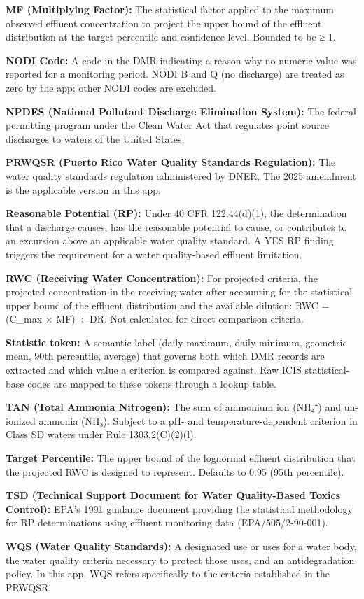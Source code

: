 \documentclass[
  11pt,
  letterpaper,
  DIV=11,
  numbers=noendperiod]{scrartcl}
\begin{document}
\textbf{MF (Multiplying Factor):} The statistical factor applied to the
maximum observed effluent concentration to project the upper bound of
the effluent distribution at the target percentile and confidence level.
Bounded to be ≥ 1.

\textbf{NODI Code:} A code in the DMR indicating a reason why no numeric
value was reported for a monitoring period. NODI B and Q (no discharge)
are treated as zero by the app; other NODI codes are excluded.

\textbf{NPDES (National Pollutant Discharge Elimination System):} The
federal permitting program under the Clean Water Act that regulates
point source discharges to waters of the United States.

\textbf{PRWQSR (Puerto Rico Water Quality Standards Regulation):} The
water quality standards regulation administered by DNER. The 2025
amendment is the applicable version in this app.

\textbf{Reasonable Potential (RP):} Under 40 CFR 122.44(d)(1), the
determination that a discharge causes, has the reasonable potential to
cause, or contributes to an excursion above an applicable water quality
standard. A YES RP finding triggers the requirement for a water
quality-based effluent limitation.

\textbf{RWC (Receiving Water Concentration):} For projected criteria,
the projected concentration in the receiving water after accounting for
the statistical upper bound of the effluent distribution and the
available dilution: RWC = (C\_max × MF) ÷ DR. Not calculated for
direct-comparison criteria.

\textbf{Statistic token:} A semantic label (daily maximum, daily
minimum, geometric mean, 90th percentile, average) that governs both
which DMR records are extracted and which value a criterion is compared
against. Raw ICIS statistical-base codes are mapped to these tokens
through a lookup table.

\textbf{TAN (Total Ammonia Nitrogen):} The sum of ammonium ion (NH₄⁺)
and un-ionized ammonia (NH₃). Subject to a pH- and temperature-dependent
criterion in Class SD waters under Rule 1303.2(C)(2)(l).

\textbf{Target Percentile:} The upper bound of the lognormal effluent
distribution that the projected RWC is designed to represent. Defaults
to 0.95 (95th percentile).

\textbf{TSD (Technical Support Document for Water Quality-Based Toxics
Control):} EPA's 1991 guidance document providing the statistical
methodology for RP determinations using effluent monitoring data
(EPA/505/2-90-001).

\textbf{WQS (Water Quality Standards):} A designated use or uses for a
water body, the water quality criteria necessary to protect those uses,
and an antidegradation policy. In this app, WQS refers specifically to
the criteria established in the PRWQSR.
\end{document}
